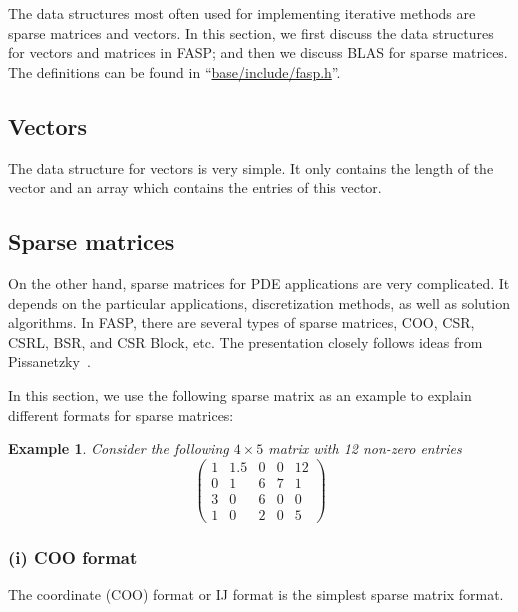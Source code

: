 \documentclass[11pt]{memoir}
\newtheorem{example}[theorem]{Example}
\begin{document}
The data structures most often used for implementing iterative methods are
sparse matrices and vectors. In this section, we first discuss the
data structures for vectors and matrices in FASP; and then we discuss
BLAS for sparse matrices. The definitions can be found in
``\url{base/include/fasp.h}''.

\subsection{Vectors}

The data structure for vectors is very simple. It only contains the length of the vector and an array which contains the entries of this vector.
%

%

\subsection{Sparse matrices}

On the other hand, sparse matrices for PDE applications are very complicated. It depends on the particular applications, discretization methods, as well as solution algorithms. In FASP, there are several types of sparse matrices, COO, CSR, CSRL, BSR, and CSR Block, etc. The presentation closely follows ideas from Pissanetzky~\cite{Pissanetzky.Pissanetzky.1984hc}.

In this section, we use the following sparse matrix as an example to explain different formats for sparse matrices:
%
\begin{example}\label{ex:sparse}
Consider the following $4\times 5$ matrix with 12 non-zero entries
$$
\left(\begin{array}{ccccc}
1 & 1.5 & 0 & 0 & 12\\
0 & 1    & 6 & 7 & 1\\
3 & 0    & 6 & 0 & 0\\
1 & 0    & 2 & 0 & 5
\end{array}
\right)
$$
\end{example}

\subsubsection*{(i) COO format}

The coordinate (COO) format or IJ format is the simplest sparse matrix format.
%

%
\end{document}
